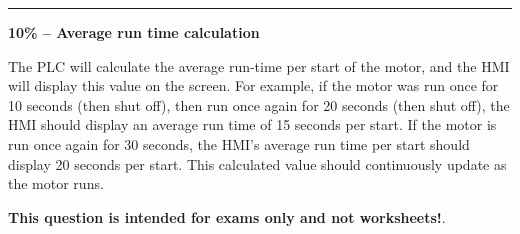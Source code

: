 \vskip 10pt
\hrule
\vskip 10pt

\noindent
{\bf 10\% -- Average run time calculation}

The PLC will calculate the average run-time per start of the motor, and the HMI will display this value on the screen.  For example, if the motor was run once for 10 seconds (then shut off), then run once again for 20 seconds (then shut off), the HMI should display an average run time of 15 seconds per start.  If the motor is run once again for 30 seconds, the HMI's average run time per start should display 20 seconds per start.  This calculated value should continuously update as the motor runs.

\vfil \eject














{\bf This question is intended for exams only and not worksheets!}.


